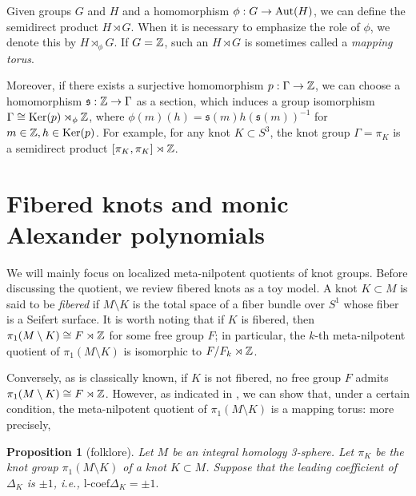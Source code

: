 \documentclass{article}
\theoremstyle{plain}
\newtheorem{prop}[thm]{Proposition}
\theoremstyle{definition}
\newcommand{\ra}{\rightarrow}
\newcommand{\Z}{{\Bbb Z}}
\newcommand{\Aut}{{\rm Aut}}
\newcommand{\lc}{{\mathrm{l}\textrm{-}\mathrm{coef}}}
\begin{document}
{%

Given groups $G$ and $H$ and a homomorphism $\phi: G \to \Aut(H)$, we can define the semidirect product $H \rtimes G$. When it is necessary to emphasize the role of $\phi$, we denote this by $H \rtimes_{\phi} G$. If $G = \Z$, such an $H \rtimes G$ is sometimes called a {\it mapping torus}.

Moreover, if there exists a surjective homomorphism $p: \Gamma \to \Z$, we can choose a homomorphism $\mathfrak{s}: \Z \to \Gamma$ as a section, which induces a group isomorphism
$\Gamma \cong \mathrm{Ker}(p) \rtimes_{\phi} \Z$, 
where $\phi(m)(h) =  \mathfrak{s} (m) h (\mathfrak{s} (m) )^{-1}$ for $m \in \Z, h \in \mathrm{Ker}(p)$. For example, for any knot $K \subset S^3$, the knot group $\Gamma= \pi_K$ is a semidirect product $[\pi_K,\pi_K] \rtimes \Z$.

\section{Fibered knots and monic Alexander polynomials}
\label{Ss3}
We will mainly focus on localized meta-nilpotent quotients of knot groups. Before discussing the quotient, we review fibered knots as a toy model. A knot $K \subset M$ is said to be {\it fibered} if $M \setminus K$ is the total space of a fiber bundle over $S^1$ whose fiber is a Seifert surface. It is worth noting that if $K$ is fibered, then $\pi_1(M \setminus K) \cong F \rtimes \Z$ for some free group $F$; in particular, the $k$-th meta-nilpotent quotient of $\pi_1(M \setminus K)$ is isomorphic to $F/F_k \rtimes \Z$.

Conversely, as is classically known, if $K$ is not fibered, no free group $F$ admits $\pi_1(M \setminus K) \cong F \rtimes \Z$. However, as indicated in \cite[\S 5]{Gor}, we can show that, under a certain condition, the meta-nilpotent quotient of $\pi_1(M \setminus K)$ is a mapping torus: more precisely,

\begin{prop}[{folklore}]\label{bb12}
Let $M$ be an integral homology 3-sphere. Let $\pi_K $ be the knot group $\pi_1(M \setminus K) $ of a knot $K \subset M $. Suppose that the leading coefficient of $\Delta_K$ is $\pm 1$, i.e., $\lc \Delta_K = \pm 1. $


\end{prop}}
\end{document}
